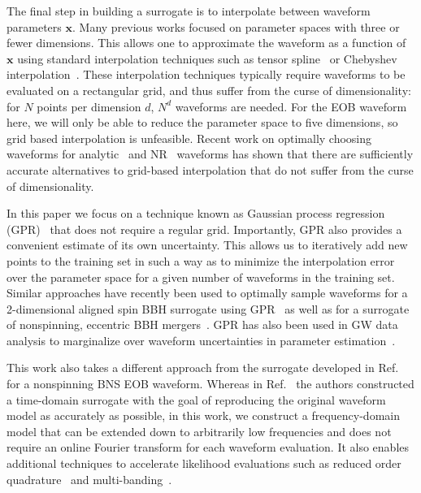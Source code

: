 \documentclass[prd,aps,letter,twocolumn,floatfix,notitlepage,nofootinbib]{revtex4-1}
\def\bx{\mathbf{x}}
\begin{document}
The final step in building a surrogate is to interpolate between waveform parameters $\bx$. Many previous works focused on parameter spaces with three or fewer dimensions. This allows one to approximate the waveform as a function of $\bx$ using standard interpolation techniques such as tensor spline~\cite{Puerrer2014, Puerrer2015} or Chebyshev interpolation~\cite{LackeyBernuzziGalley2017}. These interpolation techniques typically require waveforms to be evaluated on a rectangular grid, and thus suffer from the curse of dimensionality: for $N$ points per dimension $d$,  $N^d$ waveforms are needed. For the EOB waveform here, we will only be able to reduce the parameter space to five dimensions, so grid based interpolation is unfeasible. Recent work on optimally choosing waveforms for analytic~\cite{DoctorFarrHolz2017} and NR~\cite{BlackmanFieldScheel2017a, BlackmanFieldScheel2017b} waveforms has shown that there are sufficiently accurate alternatives to grid-based interpolation that do not suffer from the curse of dimensionality.

In this paper we focus on a technique known as Gaussian process regression (GPR)~\cite{RasmussenWilliams2006} that does not require a regular grid. Importantly, GPR also provides a convenient estimate of its own uncertainty. This allows us to iteratively add new points to the training set in such a way as to minimize the interpolation error over the parameter space for a given number of waveforms in the training set. Similar approaches have recently been used to optimally sample waveforms for a 2-dimensional aligned spin BBH surrogate using GPR~\cite{DoctorFarrHolz2017} as well as for a surrogate of nonspinning, eccentric BBH mergers~\cite{HuertaMooreKumar2017}. GPR has also been used in GW data analysis to marginalize over waveform uncertainties in parameter estimation~\cite{MooreGair2014, MooreBerryChua2016}.

This work also takes a different approach from the surrogate developed in Ref.~\cite{LackeyBernuzziGalley2017} for a nonspinning BNS EOB waveform. Whereas in Ref.~\cite{LackeyBernuzziGalley2017} the authors constructed a time-domain surrogate with the goal of reproducing the original waveform model as accurately as possible, in this work, we construct a frequency-domain model that can be extended down to arbitrarily low frequencies and does not require an online Fourier transform for each waveform evaluation. It also enables additional techniques to accelerate likelihood evaluations such as reduced order quadrature~\cite{Antil2013, CanizaresFieldGair2013, CanizaresFieldGair2015, Smith:2016qas} and multi-banding~\cite{VinciguerraVeitchMandel2017}.
\end{document}
